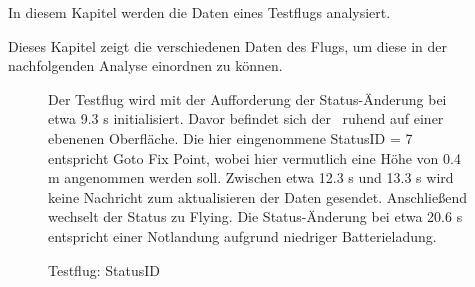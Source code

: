 
In diesem Kapitel werden die Daten eines Testflugs analysiert.






Dieses Kapitel zeigt die verschiedenen Daten des Flugs, um diese in der nachfolgenden Analyse einordnen zu können.



\begin{figure}[ht!]
\vspace{0.25cm}
\begin{center}
\caption{Testflug: StatusID}
\label{fig:FlightStatus}
\end{center}

\vspace{0.25cm}
Der Testflug wird mit der Aufforderung der Status-Änderung bei etwa 9.3 s initialisiert. Davor befindet sich der \Quad\ ruhend auf einer ebenenen Oberfläche.
Die hier eingenommene StatusID = 7 entspricht \glq Goto Fix Point\grq, wobei hier vermutlich eine Höhe von 0.4 m angenommen werden soll. Zwischen etwa 12.3 s und 13.3 s wird keine Nachricht zum aktualisieren der Daten gesendet. Anschließend wechselt der Status zu \grq Flying\glq.
Die Status-Änderung bei etwa 20.6 s entspricht einer Notlandung aufgrund niedriger Batterieladung.
\end{figure}


